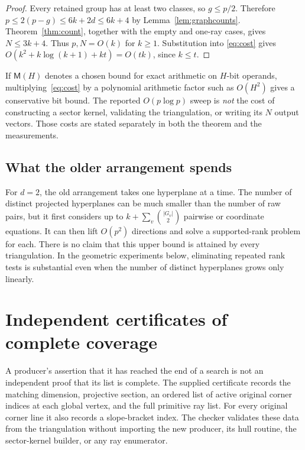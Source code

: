 \documentclass[11pt]{article}
\theoremstyle{definition}
\theoremstyle{remark}
\begin{document}
\begin{proof}
Every retained group has at least two classes, so $g\le p/2$. Therefore
$p\le2(p-g)\le6k+2d\le6k+4$ by Lemma~\ref{lem:graphcounts}.
Theorem~\ref{thm:count}, together with the empty and one-ray cases, gives
$N\le3k+4$. Thus $p,N=O(k)$ for $k\ge1$. Substitution into
\eqref{eq:cost} gives $O(k^2+k\log(k+1)+kt)=O(tk)$, since $k\le t$.
\end{proof}

If $\mathsf M(H)$ denotes a chosen bound for exact arithmetic on $H$-bit
operands, multiplying~\eqref{eq:cost} by a polynomial arithmetic factor such
as $O(H^2)$ gives a conservative bit bound. The reported
$O(p\log p)$ sweep is \emph{not} the cost of constructing a sector kernel,
validating the triangulation, or writing its $N$ output vectors. Those costs
are stated separately in both the theorem and the measurements.

\subsection{What the older arrangement spends}

For $d=2$, the old arrangement takes one hyperplane at a time. The number of
distinct projected hyperplanes can be much smaller than the number of raw
pairs, but it first considers up to
$k+\sum_v\binom{|G_v|}{2}$ pairwise or coordinate equations. It can then
lift $O(p^2)$ directions and solve a supported-rank problem for each. There
is no claim that this upper bound is attained by every triangulation. In the
geometric experiments below, eliminating repeated rank tests is substantial
even when the number of distinct hyperplanes grows only linearly.

\section{Independent certificates of complete coverage}
\label{sec:certificate}

A producer's assertion that it has reached the end of a search is not an
independent proof that its list is complete. The supplied certificate records
the matching dimension, projective section, an ordered list of active original
corner indices at each global vertex, and the full primitive ray list.
For every original corner line it also records a slope-bracket index. The
checker validates these data from the triangulation without importing the
new producer, its hull routine, the sector-kernel builder, or any ray enumerator.
\end{document}
